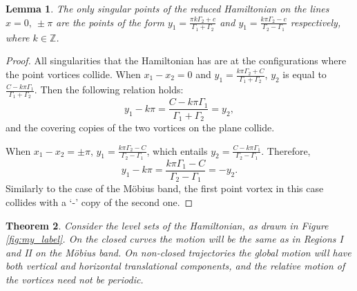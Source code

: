 \documentclass[11pt,twoside]{article}
\newtheorem{theorem}{Theorem}[section]
\newtheorem{lem}[theorem]{Lemma}
\theoremstyle{definition}
\numberwithin{equation}{section}
\begin{document}
\begin{lem}
The only singular points of the reduced Hamiltonian on the lines $x = 0, \ \pm\pi$ are the points of the form $y_1= \frac{\pi k\Gamma_2 + c}{\Gamma_1 + \Gamma_2}$ and $y_1 = \frac{k\pi\Gamma_2-c}{\Gamma_2 -\Gamma_1}$ respectively, where $k\in\mathbb{Z}$. 
\end{lem}
\begin{proof}
All singularities that the Hamiltonian has are at the configurations where the point vortices collide. When $x_1-x_2 = 0$ and $y_1 = \frac{k\pi\Gamma_2+C}{\Gamma_1 + \Gamma_2}$, $y_2$ is equal to $\frac{C-k\pi\Gamma_1}{\Gamma_1 + \Gamma_2}$. Then the following relation holds:
\[
y_1-k\pi = \frac{C-k\pi\Gamma_1}{\Gamma_1 + \Gamma_2}= y_2,
\]
and the covering copies of the two vortices on the plane collide. 


When $x_1-x_2 =\pm\pi$, $y_1 = \frac{k\pi\Gamma_2-C}{\Gamma_2-\Gamma_1}$, which entails $y_2 = \frac{C-k\pi\Gamma_1}{\Gamma_2 - \Gamma_1}$.
Therefore,
\[
y_1 - k\pi = \frac{k\pi\Gamma_1-C}{\Gamma_2-\Gamma_1} = -y_2. 
\]
Similarly to the case of the M\"obius band, the first point vortex in this case collides with a `-' copy of the second one. 

\end{proof}
\begin{theorem}
Consider the level sets of the Hamiltonian, as drawn in  Figure \ref{fig:my_label}. On the closed curves  the motion will be the same as in Regions I and II on the M\"obius band. On non-closed trajectories the global motion will have both vertical and horizontal translational components, and the relative motion of the vortices need not be periodic.
\end{theorem}
\end{document}
